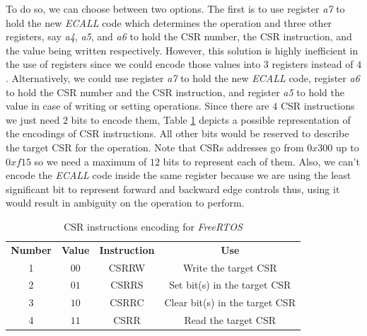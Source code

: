 To do so, we can choose between two options. The first is to use register \textit{a7}
to hold the new \textit{ECALL} code which determines the operation and three other
registers, say \textit{a4}, \textit{a5}, and \textit{a6} to hold the CSR number,
the CSR instruction, and the value being written respectively. However, this solution
is highly inefficient in the use of registers since we could encode those values
into $3$ registers instead of $4$. Alternatively, we could use register \textit{a7}
to hold the new \textit{ECALL} code, register \textit{a6} to hold the CSR number
and the CSR instruction, and register \textit{a5} to hold the value in case of writing
or setting operations. Since there are $4$ CSR instructions we just need $2$
bits to encode them, Table \ref{tab:instructionenc} depicts a possible representation
of the encodings of CSR instructions. All other bits would be reserved to
describe the target CSR for the operation. Note that CSRs addresses go from $0x30
0$ up to $0xf15$ so we need a maximum of $12$ bits to represent each of them.
Also, we can't encode the \textit{ECALL} code inside the same register because
we are using the least significant bit to represent forward and backward edge
controls thus, using it would result in ambiguity on the operation to perform.

\begin{table}
  \centering
  \begin{tabular}{|c|c|c|c|}
    \hline
    \textbf{Number} & \textbf{Value} & \textbf{Instruction} & \textbf{Use}                   \\
    \hhline{====} 1 & $00$           & CSRRW                & Write the target CSR           \\
    \hline
    2               & $01$           & CSRRS                & Set bit(s) in the target CSR   \\
    \hline
    3               & $10$           & CSRRC                & Clear bit(s) in the target CSR \\
    \hline
    4               & $11$           & CSRR                 & Read the target CSR            \\
    \hline
  \end{tabular}
  \caption{CSR instructions encoding for \textit{FreeRTOS}}
  \label{tab:instructionenc}
\end{table}

